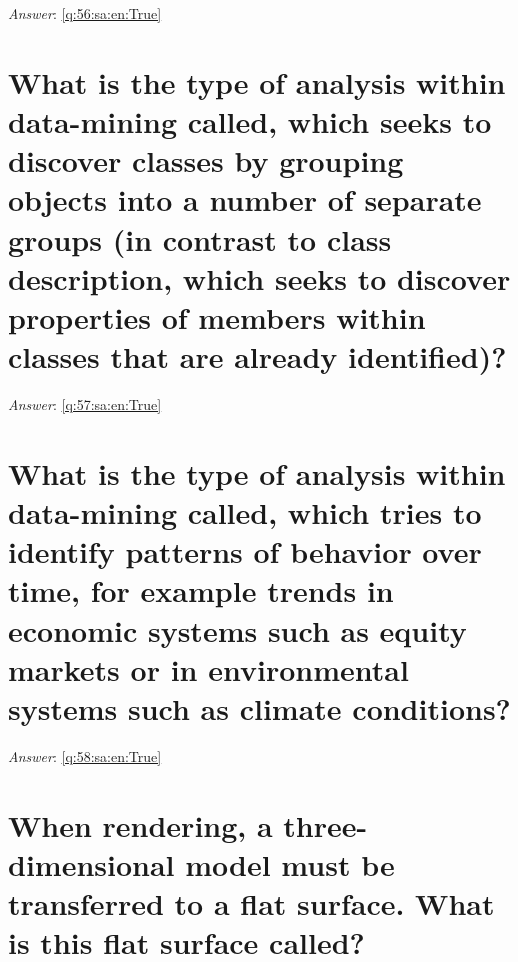 \documentclass[a4paper,11pt,oneside]{book}
\begin{document}
\begin{sloppypar}
\textit{Answer}: \autoref{q:56:sa:en:True}



\section{What is the type of analysis within data-mining called, which seeks to discover classes by grouping objects into a number of separate groups (in contrast to class description, which seeks to discover properties of members within classes that are already identified)?}

\label{q:57:sa:en:False}

\vspace{2cm}

\noindent\makebox[\textwidth]{\hrulefill}

\vspace{1cm}

\textit{Answer}: \autoref{q:57:sa:en:True}



\section{What is the type of analysis within data-mining called, which tries to identify patterns of behavior over time, for example trends in economic systems such as equity markets or in environmental systems such as climate conditions?}

\label{q:58:sa:en:False}

\vspace{2cm}

\noindent\makebox[\textwidth]{\hrulefill}

\vspace{1cm}

\textit{Answer}: \autoref{q:58:sa:en:True}



\section{When rendering, a three-dimensional model must be transferred to a flat surface. What is this flat surface called?}

\label{q:59:sa:en:False}

\vspace{2cm}

\noindent\makebox[\textwidth]{\hrulefill}

\vspace{1cm}


\end{sloppypar}
\end{document}
